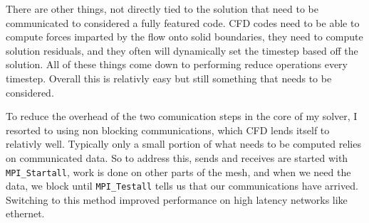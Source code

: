 \documentclass[12pt,parskip=full]{article}
\numberwithin{subsection}{section}
\begin{document}
		\begin{figure}[H]
			\centering
			\begin{subfigure}[H]{0.6\textwidth}
			\end{subfigure}
			\begin{subfigure}[H]{0.6\textwidth}
			\end{subfigure}
		\end{figure}
		There are other things, not directly tied to the solution that need to be communicated to considered a fully featured code.
		CFD codes need to be able to compute forces imparted by the flow onto solid boundaries, they need to compute solution residuals,
		and they often will dynamically set the timestep based off the solution. All of these things come down to performing reduce
		operations every timestep. Overall this is relativly easy but still something that needs to be considered.

		To reduce the overhead of the two comunication steps in the core of my solver, I resorted to using non blocking communications,
		which CFD lends itself to relativly well. Typically only a small portion of what needs to be computed relies on communicated data.
		So to address this, sends and receives are started with \verb|MPI_Startall|, work is done on other parts of the mesh, and when we
		need the data, we block until \verb|MPI_Testall| tells us that our communications have arrived. Switching to this method improved
		performance on high latency networks like ethernet.
\end{document}
